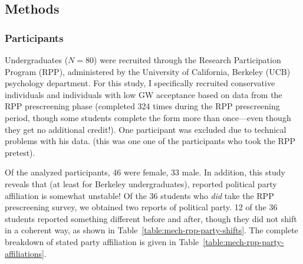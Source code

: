 \subsection{Methods}
\label{sec:mech-online-methods}

\subsubsection{Participants}

Undergraduates ($N=80$) were recruited through the Research Participation
Program (RPP), administered by the University of California, Berkeley (UCB)
psychology department. For this study, I specifically recruited conservative
individuals and individuals with low GW acceptance based on data from the RPP
prescreening phase (completed 324 times during the RPP prescreening period,
though some students complete the form more than once---even though they get no
additional credit!). One participant was excluded due to technical problems with
his data.  (this was one one of the participants who took the RPP pretest).

Of the analyzed participants, 46 were female, 33 male. In addition, this study
reveals that (at least for Berkeley undergraduates), reported political party
affiliation is somewhat unstable! Of the 36 students who \emph{did} take the
RPP prescreening survey, we obtained two reports of political party. 12 of the
36 students reported something different before and after, though they did not
shift in a coherent way, as shown in Table~\ref{table:mech-rpp-party-shifts}.
The complete breakdown of stated party affiliation is given in
Table~\ref{table:mech-rpp-party-affiliations}.

